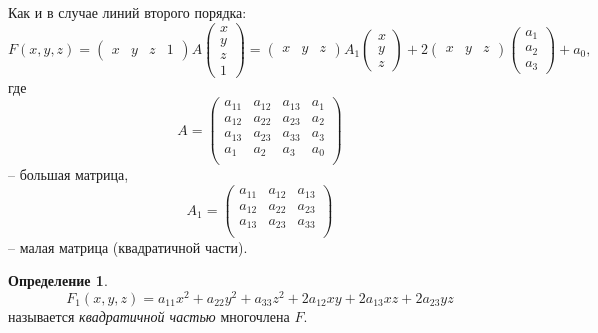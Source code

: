 \documentclass[a4paper, 12pt]{article}
\theoremstyle{definition}
\newtheorem*{definition}{Определение}
\begin{document}
Как и в случае линий второго порядка:
\[ F(x,y,z) = \begin{pmatrix}
    x & y & z & 1
\end{pmatrix}
A
\begin{pmatrix}
    x \\ y \\ z \\ 1
\end{pmatrix}
=
\begin{pmatrix}
    x & y & z
\end{pmatrix}
A_1
\begin{pmatrix}
    x \\ y \\ z
\end{pmatrix} 
+ 2 \begin{pmatrix}
    x & y & z
\end{pmatrix}
\begin{pmatrix}
    a_1 \\ a_2 \\ a_3
\end{pmatrix} 
+ a_0,
\]
где
\[ A =
\begin{pmatrix}
    a_{11} & a_{12} & a_{13} & a_{1} \\
    a_{12} & a_{22} & a_{23} & a_{2} \\
    a_{13} & a_{23} & a_{33} & a_{3} \\
    a_{1} & a_{2} & a_{3} & a_{0} \\
\end{pmatrix}
\] – большая матрица,
\[ A_1 =
\begin{pmatrix}
    a_{11} & a_{12} & a_{13} \\
    a_{12} & a_{22} & a_{23} \\
    a_{13} & a_{23} & a_{33} \\
\end{pmatrix}
\] – малая матрица (квадратичной части).

\begin{definition}
    \[ F_1(x, y, z) = a_{11} x^2 + a_{22} y^2 + a_{33} z^2 + 2a_{12} xy + 2a_{13} xz + 2a_{23} yz\]
    называется \textit{квадратичной частью} многочлена $F$.
\end{definition}
\end{document}

